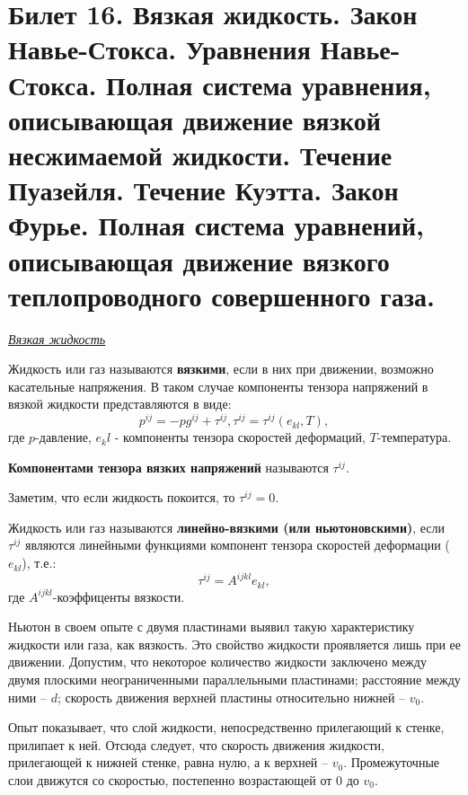 \newpage
\section{Билет 16. Вязкая жидкость. Закон Навье-Стокса. Уравнения Навье-Стокса. Полная система уравнения, описывающая движение вязкой несжимаемой жидкости. Течение Пуазейля. Течение Куэтта. Закон Фурье. Полная система уравнений, описывающая движение вязкого теплопроводного совершенного газа.}

\begin{center}
	\textit{\underline{Вязкая жидкость}}
\end{center}

\begin{defn}
	Жидкость или газ называются \textbf{вязкими}, если в них при движении, возможно касательные напряжения. В таком случае компоненты тензора напряжений в вязкой жидкости представляются в виде: $$p^{ij}=-pg^{ij} + \tau^{ij},  \tau^{ij} = \tau^{ij}(e_{kl}, T) ,$$
	где $p$-давление, $e_kl$ - компоненты тензора скоростей деформаций, $T$-температура. 
\end{defn}

\begin{defn}
	\textbf{Компонентами тензора вязких напряжений} называются $\tau^{ij}$.
\end{defn}

Заметим, что если жидкость покоится, то $\tau^{ij} = 0$.

\begin{defn}
	Жидкость или газ называются \textbf{линейно-вязкими (или ньютоновскими)}, если $\tau^{ij}$ являются линейными функциями компонент тензора скоростей деформации ($e_{kl}$), т.е.: $$\tau^{ij} = A^{ijkl}e_{kl}, $$ где $A^{ijkl}$-коэффиценты вязкости.
\end{defn}


Ньютон в своем опыте с двумя пластинами выявил такую характеристику жидкости или газа, как вязкость.  Это свойство жидкости проявляется лишь при ее движении. Допустим, что некоторое количество жидкости заключено между двумя плоскими неограниченными параллельными пластинами; расстояние между ними – $d$; скорость движения верхней пластины относительно нижней – $v_0$.

Опыт показывает, что слой жидкости, непосредственно прилегающий к стенке, прилипает к ней. Отсюда следует, что скорость движения жидкости, прилегающей к нижней стенке, равна нулю, а к верхней – $v_0$. Промежуточные слои движутся со скоростью, постепенно возрастающей от $0$ до $v_0$.

